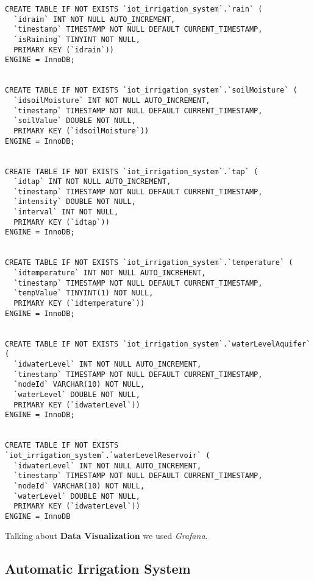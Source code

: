 \begin{verbatim}
CREATE TABLE IF NOT EXISTS `iot_irrigation_system`.`rain` (
  `idrain` INT NOT NULL AUTO_INCREMENT,
  `timestamp` TIMESTAMP NOT NULL DEFAULT CURRENT_TIMESTAMP,
  `isRaining` TINYINT NOT NULL,
  PRIMARY KEY (`idrain`))
ENGINE = InnoDB;


CREATE TABLE IF NOT EXISTS `iot_irrigation_system`.`soilMoisture` (
  `idsoilMoisture` INT NOT NULL AUTO_INCREMENT,
  `timestamp` TIMESTAMP NOT NULL DEFAULT CURRENT_TIMESTAMP,
  `soilValue` DOUBLE NOT NULL,
  PRIMARY KEY (`idsoilMoisture`))
ENGINE = InnoDB;


CREATE TABLE IF NOT EXISTS `iot_irrigation_system`.`tap` (
  `idtap` INT NOT NULL AUTO_INCREMENT,
  `timestamp` TIMESTAMP NOT NULL DEFAULT CURRENT_TIMESTAMP,
  `intensity` DOUBLE NOT NULL,
  `interval` INT NOT NULL,
  PRIMARY KEY (`idtap`))
ENGINE = InnoDB;


CREATE TABLE IF NOT EXISTS `iot_irrigation_system`.`temperature` (
  `idtemperature` INT NOT NULL AUTO_INCREMENT,
  `timestamp` TIMESTAMP NOT NULL DEFAULT CURRENT_TIMESTAMP,
  `tempValue` TINYINT(1) NOT NULL,
  PRIMARY KEY (`idtemperature`))
ENGINE = InnoDB;


CREATE TABLE IF NOT EXISTS `iot_irrigation_system`.`waterLevelAquifer` (
  `idwaterLevel` INT NOT NULL AUTO_INCREMENT,
  `timestamp` TIMESTAMP NOT NULL DEFAULT CURRENT_TIMESTAMP,
  `nodeId` VARCHAR(10) NOT NULL,
  `waterLevel` DOUBLE NOT NULL,
  PRIMARY KEY (`idwaterLevel`))
ENGINE = InnoDB;


CREATE TABLE IF NOT EXISTS `iot_irrigation_system`.`waterLevelReservoir` (
  `idwaterLevel` INT NOT NULL AUTO_INCREMENT,
  `timestamp` TIMESTAMP NOT NULL DEFAULT CURRENT_TIMESTAMP,
  `nodeId` VARCHAR(10) NOT NULL,
  `waterLevel` DOUBLE NOT NULL,
  PRIMARY KEY (`idwaterLevel`))
ENGINE = InnoDB
\end{verbatim}


Talking about \textbf{Data Visualization} we used \textit{Grafana}.

\subsection{Automatic Irrigation System}
